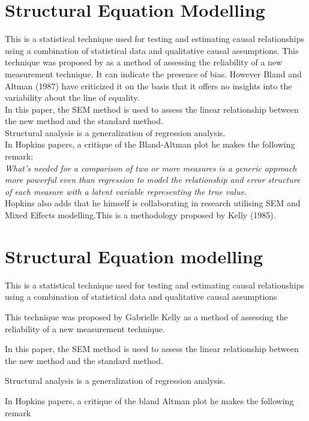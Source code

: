 \documentclass[12pt, a4paper]{report}
\theoremstyle{plain}
\theoremstyle{definition}
\theoremstyle{remark}
\begin{document}
\section{Structural Equation Modelling}
This is a statistical technique used for testing and estimating causal relationships using a combination of statistical data and qualitative causal assumptions. This technique was proposed by \citet{Lewis} as a method of assessing the reliability of a new measurement technique. It can indicate the presence of bias. However Bland and Altman (1987) have criticized it on the basis that it offers no insights into the variability about the line of equality.
\\
In this paper, the SEM method is used to assess the linear relationship between the new method and the standard method.
\\
Structural analysis is a generalization of regression analysis.
\\
In Hopkins papers, a critique of the Bland-Altman plot he makes the following remark:
\\
\emph{What's needed for a comparison of two or more measures is a
	generic approach more powerful even than regression to model the
	relationship and error structure of each measure with a latent
	variable representing the true value.}
\\
Hopkins also adds that he himself is collaborating in research utilising SEM and Mixed Effects modelling.This is a methodology proposed by Kelly (1985).

\section{Structural Equation modelling}

This is a statistical technique used for testing and estimating causal relationships using a combination of statistical data and qualitative causal assumptions

This technique was proposed by Gabrielle Kelly as a method of assessing the reliability of a new measurement technique.

In this paper, the SEM method is used to assess the linear relationship between the new method and the standard method.

Structural analysis is a generalization of regression analysis.

In Hopkins papers, a critique of the bland Altman plot he makes the following remark
\end{document}
